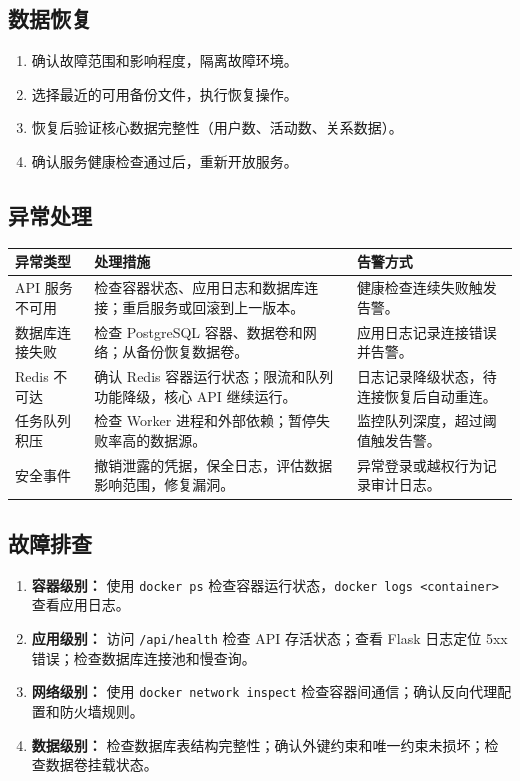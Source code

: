 \documentclass[12pt,a4paper]{ctexart}
\begin{document}
\subsection{数据恢复}
\begin{enumerate}
\item 确认故障范围和影响程度，隔离故障环境。
\item 选择最近的可用备份文件，执行恢复操作。
\item 恢复后验证核心数据完整性（用户数、活动数、关系数据）。
\item 确认服务健康检查通过后，重新开放服务。
\end{enumerate}

\subsection{异常处理}
\noindent\begin{tabularx}{\textwidth}{p{2.8cm}Y p{3.5cm}}
\toprule 异常类型 & 处理措施 & 告警方式 \\\midrule
API 服务不可用 & 检查容器状态、应用日志和数据库连接；重启服务或回滚到上一版本。 & 健康检查连续失败触发告警。 \\
数据库连接失败 & 检查 PostgreSQL 容器、数据卷和网络；从备份恢复数据卷。 & 应用日志记录连接错误并告警。 \\
Redis 不可达 & 确认 Redis 容器运行状态；限流和队列功能降级，核心 API 继续运行。 & 日志记录降级状态，待连接恢复后自动重连。 \\
任务队列积压 & 检查 Worker 进程和外部依赖；暂停失败率高的数据源。 & 监控队列深度，超过阈值触发告警。 \\
安全事件 & 撤销泄露的凭据，保全日志，评估数据影响范围，修复漏洞。 & 异常登录或越权行为记录审计日志。 \\
\bottomrule
\end{tabularx}

\subsection{故障排查}
\begin{enumerate}
\item \textbf{容器级别：} 使用 \texttt{docker ps} 检查容器运行状态，\texttt{docker logs <container>} 查看应用日志。
\item \textbf{应用级别：} 访问 \texttt{/api/health} 检查 API 存活状态；查看 Flask 日志定位 5xx 错误；检查数据库连接池和慢查询。
\item \textbf{网络级别：} 使用 \texttt{docker network inspect} 检查容器间通信；确认反向代理配置和防火墙规则。
\item \textbf{数据级别：} 检查数据库表结构完整性；确认外键约束和唯一约束未损坏；检查数据卷挂载状态。
\end{enumerate}
\end{document}
